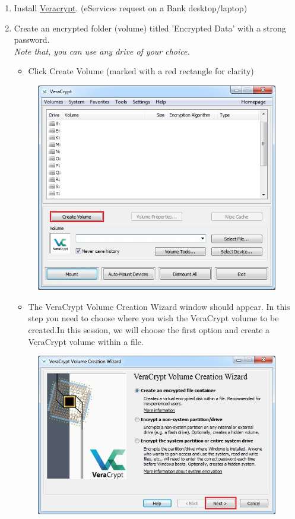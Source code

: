 \documentclass{tufte-handout}
\begin{document}
\begin{enumerate}
	\item Install \href{https://www.veracrypt.fr/en/Downloads.html}{Veracrypt}. (eServices request on a Bank desktop/laptop)
	\item Create an encrypted folder (volume) titled 'Encrypted Data' with a strong password. \\
	\textit{Note that, you can use any drive of your choice.}
	\begin{itemize}
		\item  Click Create Volume (marked with a red rectangle for clarity)
	\end{itemize}
	\begin{figure}%
		\includegraphics[width=\linewidth]{img/vc_install_1.png}
	\end{figure}
	\begin{itemize}
	\item  The VeraCrypt Volume Creation Wizard window should appear.
	In this step you need to choose where you wish the VeraCrypt volume to be created.In this session, we will choose the first option and create a VeraCrypt volume within a file.
	\end{itemize}
	\begin{figure}%
		\includegraphics[width=\linewidth]{img/vc_install_2.png}

\end{figure}
\end{enumerate}
\end{document}
